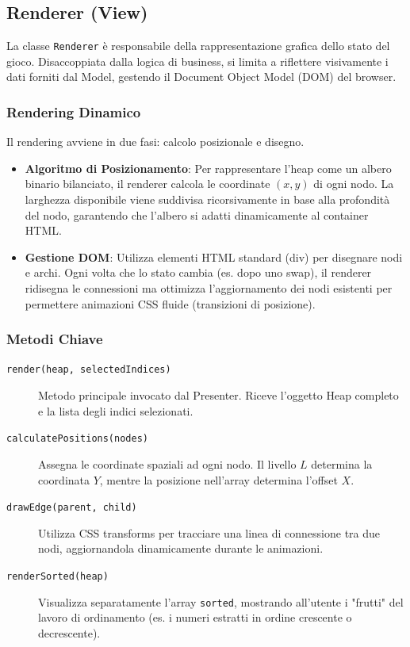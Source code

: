 \documentclass[openany]{theme/uniprthesis}
\begin{document}

\subsection{Renderer (View)}
La classe \texttt{Renderer} è responsabile della rappresentazione grafica dello stato del gioco. Disaccoppiata dalla logica di business, si limita a riflettere visivamente i dati forniti dal Model, gestendo il Document Object Model (DOM) del browser.

\subsubsection*{Rendering Dinamico}
Il rendering avviene in due fasi: calcolo posizionale e disegno.
\begin{itemize}
    \item \textbf{Algoritmo di Posizionamento}: Per rappresentare l'heap come un albero binario bilanciato, il renderer calcola le coordinate $(x, y)$ di ogni nodo. La larghezza disponibile viene suddivisa ricorsivamente in base alla profondità del nodo, garantendo che l'albero si adatti dinamicamente al container HTML.
    \item \textbf{Gestione DOM}: Utilizza elementi HTML standard (div) per disegnare nodi e archi. Ogni volta che lo stato cambia (es. dopo uno swap), il renderer ridisegna le connessioni ma ottimizza l'aggiornamento dei nodi esistenti per permettere animazioni CSS fluide (transizioni di posizione).
\end{itemize}

\subsubsection*{Metodi Chiave}
\begin{description}
    \item[\texttt{render(heap, selectedIndices)}] Metodo principale invocato dal Presenter. Riceve l'oggetto Heap completo e la lista degli indici selezionati.
    \item[\texttt{calculatePositions(nodes)}] Assegna le coordinate spaziali ad ogni nodo. Il livello $L$ determina la coordinata $Y$, mentre la posizione nell'array determina l'offset $X$.
    \item[\texttt{drawEdge(parent, child)}] Utilizza CSS transforms per tracciare una linea di connessione tra due nodi, aggiornandola dinamicamente durante le animazioni.
    \item[\texttt{renderSorted(heap)}] Visualizza separatamente l'array \texttt{sorted}, mostrando all'utente i "frutti" del lavoro di ordinamento (es. i numeri estratti in ordine crescente o decrescente).
\end{description}
\end{document}
